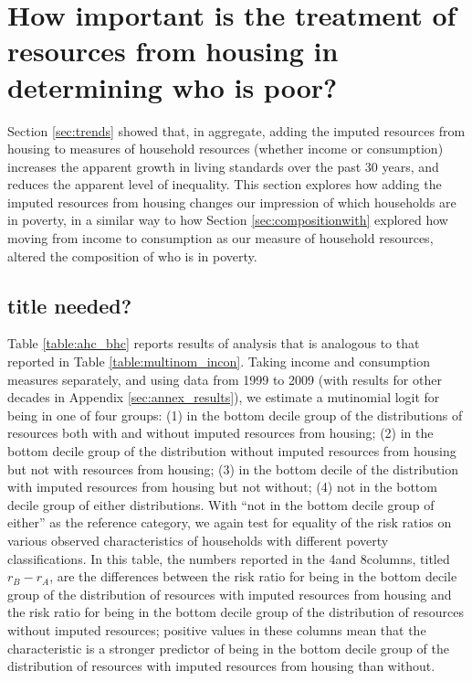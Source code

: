 \section{How important is the treatment of resources from housing in determining who is poor?}\label{sec:housing}

Section \ref{sec:trends} showed that, in aggregate, adding the imputed resources from housing to measures of household resources (whether income or consumption) increases the apparent growth in living standards over the past 30 years, and reduces the apparent level of inequality.   This section explores how adding the imputed resources from housing changes our impression of which households are in poverty, in a similar way to how Section \ref{sec:compositionwith} explored how moving from income to consumption as our measure of household resources, altered the composition of who is in poverty. 



\subsection{title needed?}

Table \ref{table:ahc_bhc} reports results of analysis that is analogous to that reported in Table \ref{table:multinom_incon}. Taking income and consumption measures separately, and using data from 1999 to 2009 (with results for other decades in Appendix \ref{sec:annex_results}), we estimate a mutinomial logit for being in one of four groups: (1) in the bottom decile group of the distributions of resources both with and without imputed resources from housing; (2) in the bottom decile group of the distribution without imputed resources from housing but not with resources from housing; (3) in the bottom decile of the distribution with imputed resources from housing but not without; (4) not in the bottom decile group of either distributions.  With ``not in the bottom decile group of either'' as the reference category, we again test for equality of the risk ratios on various observed characteristics of households with different poverty classifications.  In this table, the numbers reported in the 4\nth and 8\nth columns, titled $r_{B}-r_{A}$, are the differences between the risk ratio for being in the bottom decile group of the distribution of resources with imputed resources from housing and the risk ratio for being in the bottom decile group of the distribution of resources without imputed resources; positive values in these columns mean that the characteristic is a stronger predictor of being in the bottom decile group of the distribution of resources with imputed resources from housing than without.

